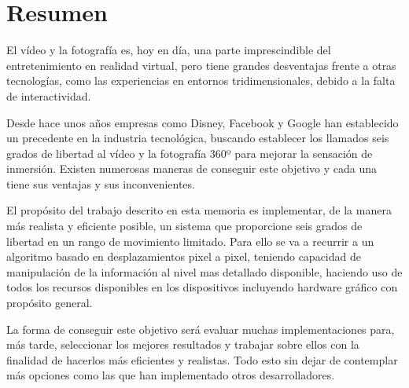 
\pagestyle{empty}
\chapter {Resumen}

El vídeo y la fotografía es, hoy en día, una parte imprescindible del entretenimiento en  realidad virtual, pero tiene grandes desventajas frente a otras tecnologías, como las experiencias en entornos tridimensionales, debido a la falta de interactividad.

Desde hace unos años empresas como Disney, Facebook y Google han establecido un precedente en la industria tecnológica, buscando establecer los llamados seis grados de libertad al vídeo y la fotografía 360º para mejorar la sensación de inmersión. Existen numerosas maneras de conseguir este objetivo y cada una tiene sus ventajas y sus inconvenientes.

El propósito del trabajo descrito en esta memoria es implementar, de la manera más realista y eficiente posible, un sistema que proporcione seis grados de libertad en un rango de movimiento limitado. Para ello se va a recurrir a un algoritmo basado en desplazamientos pixel a pixel, teniendo capacidad de manipulación de la información al nivel mas detallado disponible, haciendo uso de todos los recursos disponibles en los dispositivos incluyendo hardware gráfico con propósito general.

La forma de conseguir este objetivo será evaluar muchas implementaciones para, más tarde, seleccionar los mejores resultados y trabajar sobre ellos con la finalidad de hacerlos más eficientes y realistas. Todo esto sin dejar de contemplar más opciones como las que han implementado otros desarrolladores.